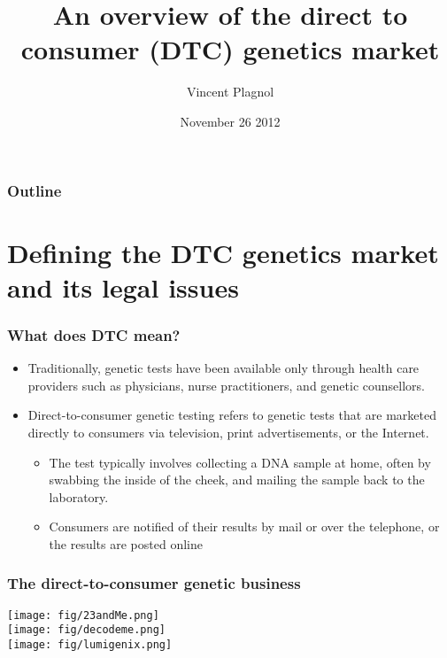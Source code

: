 \documentclass{beamer}
\title[]{An overview of the direct to consumer (DTC) genetics market}
\author[]{Vincent Plagnol}
\date{November 26 2012}
\institute{UCL Genetics Institute}
\begin{document}
\begin{frame}
  \titlepage
\end{frame}


\begin{frame}
 \frametitle{Outline}
 \tableofcontents
\end{frame}





\section{Defining the DTC genetics market and its legal issues}


\begin{frame}
  \frametitle{What does DTC mean?}
  \begin{itemize}
  \item Traditionally, genetic tests have been available only through health care providers such as physicians, nurse practitioners, and genetic counsellors. 
  \item Direct-to-consumer genetic testing refers to genetic tests that are marketed directly to consumers via television, print advertisements, or the Internet. 
    \begin{itemize}
    \item The test typically involves collecting a DNA sample at home, often by swabbing the inside of the cheek, and mailing the sample back to the laboratory.
    \item Consumers are notified of their results by mail or over the telephone, or the results are posted online
    \end{itemize}
  \end{itemize}
\end{frame}



\begin{frame}
  \frametitle{The direct-to-consumer genetic business}
   \begin{center}
     \texttt{[image: fig/23andMe.png]}\\
     \vspace{1cm}
     \texttt{[image: fig/decodeme.png]}\\
     \vspace{1cm}
     \texttt{[image: fig/lumigenix.png]}\\
  \end{center}
\end{frame}
\end{document}
